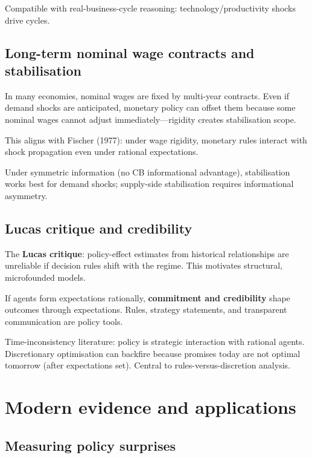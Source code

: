 \documentclass[
  letterpaper,
  DIV=11,
  numbers=noendperiod]{scrartcl}
\begin{document}
Compatible with real-business-cycle reasoning: technology/productivity
shocks drive cycles.

\subsection{Long-term nominal wage contracts and
stabilisation}\label{long-term-nominal-wage-contracts-and-stabilisation}

In many economies, nominal wages are fixed by multi-year contracts. Even
if demand shocks are anticipated, monetary policy can offset them
because some nominal wages cannot adjust immediately---rigidity creates
stabilisation scope.

This aligns with Fischer (1977): under wage rigidity, monetary rules
interact with shock propagation even under rational expectations.

Under symmetric information (no CB informational advantage),
stabilisation works best for demand shocks; supply-side stabilisation
requires informational asymmetry.

\subsection{Lucas critique and
credibility}\label{lucas-critique-and-credibility}

The \textbf{Lucas critique}: policy-effect estimates from historical
relationships are unreliable if decision rules shift with the regime.
This motivates structural, microfounded models.

If agents form expectations rationally, \textbf{commitment and
credibility} shape outcomes through expectations. Rules, strategy
statements, and transparent communication are policy tools.

Time-inconsistency literature: policy is strategic interaction with
rational agents. Discretionary optimisation can backfire because
promises today are not optimal tomorrow (after expectations set).
Central to rules-versus-discretion analysis.

\section{Modern evidence and
applications}\label{modern-evidence-and-applications}

\subsection{Measuring policy
surprises}\label{measuring-policy-surprises}
\end{document}
